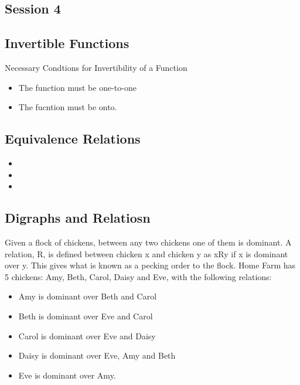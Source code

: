 \documentclass[]{report}
\begin{document}
\begin{enumerate}
\chapter{Session 4}
\section*{Invertible Functions}

Necessary Condtions for Invertibility of a Function
\begin{itemize}
\item The function must be one-to-one
\item The fucntion must be onto.
\end{itemize}


\section*{Equivalence Relations}
\begin{itemize}
\item
\item
\item
\end{itemize}




\section{Digraphs and Relatiosn}
Given a flock of chickens, between any two chickens one of them is
dominant. A relation, R, is defined between chicken x and chicken y as xRy if x is
dominant over y. This gives what is known as a pecking order to the flock. Home
Farm has 5 chickens: Amy, Beth, Carol, Daisy and Eve, with the following relations:

\begin{itemize}
\item Amy is dominant over Beth and Carol
\item Beth is dominant over Eve and Carol
\item Carol is dominant over Eve and Daisy
\item Daisy is dominant over Eve, Amy and Beth
\item Eve is dominant over Amy.
\end{itemize}


\end{enumerate}
\end{document}
